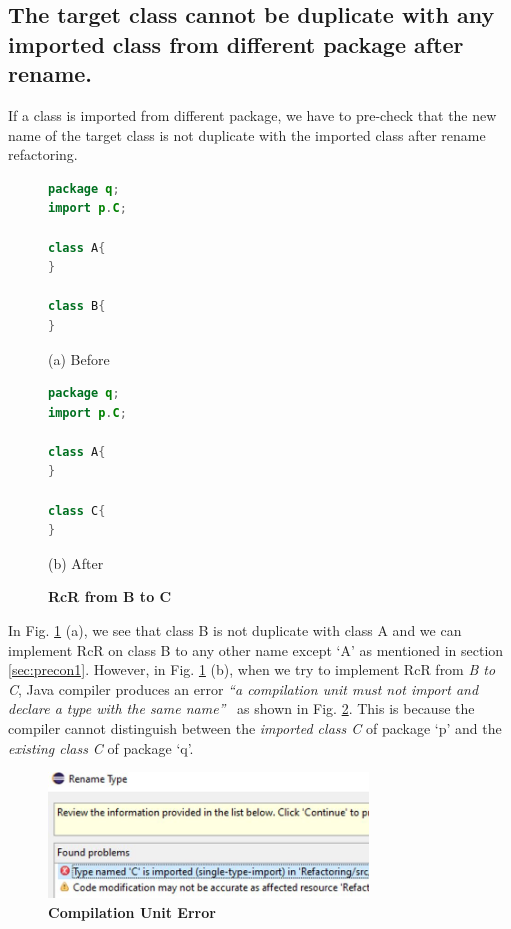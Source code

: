 \subsection{The target class cannot be duplicate with any imported class from different package after rename.}

If a class is imported from different package, we have to pre-check that the new name of the target class is not duplicate with the imported class after rename refactoring. 

\begin{figure}[th]
\centering
\begin{minipage}[t]{0.4\linewidth}
\begin{lstlisting}[language=java, basicstyle=\scriptsize\ttfamily,frame=single]
package q;
import p.C;

class A{
}

class B{
} 
\end{lstlisting}
\centering(a) Before
\end{minipage}
\hfill
\begin{minipage}[t]{0.4\linewidth}
\begin{lstlisting}[language=java, basicstyle=\scriptsize\ttfamily,frame=single]
package q;
import p.C;

class A{
}

class C{
} 
\end{lstlisting}
\centering(b) After
\end{minipage}
\caption{\textbf{RcR from B to C}}
\label{figure:fig2}
\end{figure}

In Fig. \ref{figure:fig2} (a), we see that class B is not duplicate with class A and we can implement RcR on class B to any other name except `A' as mentioned in section \ref{sec:precon1}. However, in Fig. \ref{figure:fig2} (b), when we try to implement RcR from \emph{B to C}, Java compiler produces an error \textit{``a compilation unit must not import and declare a type with the same name''}~\cite{EclipseWebPage} as shown in Fig. \ref{figure:comperr}. This is because the compiler cannot distinguish between the \emph{imported class C} of package `p' and the \emph{existing class C} of package `q'. 

\begin{figure}[H]
\centerline{\includegraphics[width=85mm,scale=0.5]{CUE.jpg}}
\caption{\textbf{Compilation Unit Error} }
\label{figure:comperr}
\end{figure}


